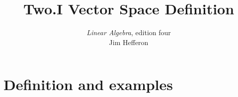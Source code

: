 \usepackage{linalgjh}
\usepackage{present}
\usepackage{directories}  %
\usepackage{xr} %
\usepackage{catchfilebetweentags}
\usepackage{etoolbox} %
\makeatletter
\patchcmd{\CatchFBT@Fin@l}{\endlinechar\m@ne}{}
  {}{}
\makeatother

{
}
\hypersetup{colorlinks=true,linkcolor=blue} 

\title[Vector Space Definition] %
{Two.I Vector Space Definition}

\author{\textit{Linear Algebra}, edition four \\ {\small Jim Hef{}feron}}
\date{}


\subject{Vector Space Definition}


\begin{frame}
  \titlepage
\end{frame}




\section{Definition and examples}





